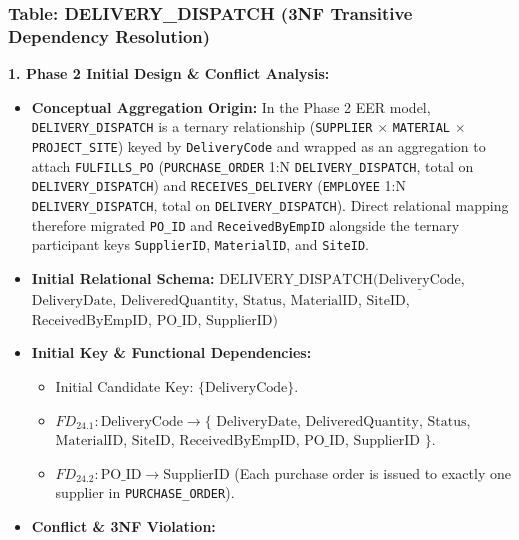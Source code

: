 \documentclass[a4paper,12pt]{report}
\begin{document}
\subsubsection{\texorpdfstring{Table: DELIVERY\_\allowbreak{}DISPATCH (3NF Transitive Dependency Resolution)}{Table: DELIVERYDISPATCH (3NF Transitive Dependency Resolution)}}\label{table-delivery_dispatch-3nf-transitive-dependency-resolution}

\textbf{1. Phase 2 Initial Design \& Conflict Analysis:}

\begin{itemize}
\item
  \textbf{Conceptual Aggregation Origin:} In the Phase 2 EER model, \texttt{DELIVERY\_\allowbreak{}DISPATCH} is a ternary relationship (\texttt{SUPPLIER} \(\times\) \texttt{MATERIAL} \(\times\) \texttt{PROJECT\_\allowbreak{}SITE}) keyed by \texttt{DeliveryCode} and wrapped as an aggregation to attach \texttt{FULFILLS\_\allowbreak{}PO} (\texttt{PURCHASE\_\allowbreak{}ORDER} 1:N \texttt{DELIVERY\_\allowbreak{}DISPATCH}, total on \texttt{DELIVERY\_\allowbreak{}DISPATCH}) and \texttt{RECEIVES\_\allowbreak{}DELIVERY} (\texttt{EMPLOYEE} 1:N \texttt{DELIVERY\_\allowbreak{}DISPATCH}, total on \texttt{DELIVERY\_\allowbreak{}DISPATCH}). Direct relational mapping therefore migrated \texttt{PO\_\allowbreak{}ID} and \texttt{ReceivedByEmpID} alongside the ternary participant keys \texttt{SupplierID}, \texttt{MaterialID}, and \texttt{SiteID}.
\item
  \textbf{Initial Relational Schema:} \(\text{DELIVERY\_DISPATCH}(\underline{\text{DeliveryCode}}\), \(\text{DeliveryDate}\), \(\text{DeliveredQuantity}\), \(\text{Status}\), \(\text{MaterialID}\), \(\text{SiteID}\), \(\text{ReceivedByEmpID}\), \(\text{PO\_ID}\), \(\text{SupplierID})\)
\item
  \textbf{Initial Key \& Functional Dependencies:}

  \begin{itemize}
  \item
    Initial Candidate Key: \(\{\text{DeliveryCode}\}\).
  \item
    \(FD_{24.1}: \text{DeliveryCode} \rightarrow \{\) \(\text{DeliveryDate}\), \(\text{DeliveredQuantity}\), \(\text{Status}\), \(\text{MaterialID}\), \(\text{SiteID}\), \(\text{ReceivedByEmpID}\), \(\text{PO\_ID}\), \(\text{SupplierID}\) \(\}\).
  \item
    \(FD_{24.2}: \text{PO\_ID} \rightarrow \text{SupplierID}\) (Each purchase order is issued to exactly one supplier in \texttt{PURCHASE\_\allowbreak{}ORDER}).
  \end{itemize}
\item
  \textbf{Conflict \& 3NF Violation:}


\end{itemize}
\end{document}

